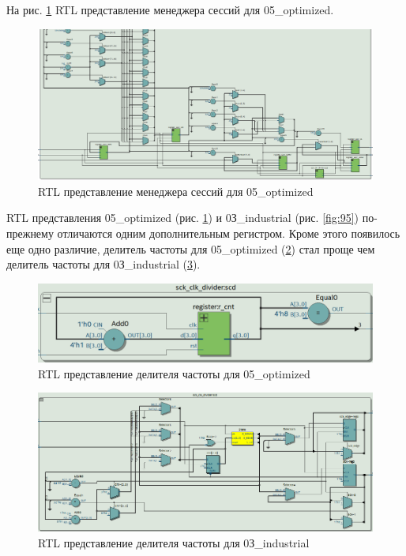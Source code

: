 \documentclass[a4paper,14pt]{article}
\begin{document}
	На рис. \ref{fig:z6rtl} RTL представление менеджера сессий для 05\_optimized.
	
	\begin{figure}[H]
		\centering
		\includegraphics[width=0.9\linewidth]{images/z6_rtl}
		\caption{RTL представление менеджера сессий для 05\_optimized}
		\label{fig:z6rtl}
	\end{figure}
	
	RTL представления 05\_optimized (рис. \ref{fig:z6rtl}) и  0З\_industrial (рис. \ref{fig:95}) по-прежнему отличаются одним дополнительным регистром.
	Кроме этого появилось еще одно различие, делитель частоты для 05\_optimized (\ref{fig:z6trlclkdiv}) стал проще чем делитель частоты для 0З\_industrial (\ref{fig:z15rtlclkdivider1}).
	
	\begin{figure}[H]
		\centering
		\includegraphics[width=0.7\linewidth]{images/z6_trl_clk_div}
		\caption{RTL представление делителя частоты для 05\_optimized}
		\label{fig:z6trlclkdiv}
	\end{figure}

	\begin{figure}[H]
		\centering
		\includegraphics[width=0.9\linewidth]{images/z1_5_rtl_clk_divider}
		\caption{RTL представление делителя частоты для 0З\_industrial}
		\label{fig:z15rtlclkdivider1}
	\end{figure}
	
\end{document}
